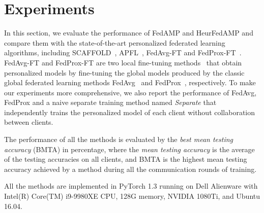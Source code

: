 
\section{Experiments}
\label{sec:exp}

In this section, we evaluate the performance of {FedAMP} and {HeurFedAMP} and compare them with the state-of-the-art personalized federated learning algorithms, including SCAFFOLD~\cite{karimireddy2019scaffold}, APFL~\cite{deng2020adaptive}, FedAvg-FT and FedProx-FT~\cite{wang2019federated}.
FedAvg-FT and FedProx-FT are two local fine-tuning methods~\cite{wang2019federated} that obtain personalized models by fine-tuning the global models produced by the classic global federated learning methods
FedAvg~\cite{mcmahan2016communication} and FedProx~\cite{li2018federated}, respectively.
To make our experiments more comprehensive, we also report the performance of FedAvg, FedProx and a naive separate training method named \emph{Separate} that independently trains the personalized model of each client without collaboration between clients. 

The performance of all the methods is evaluated by the \emph{best mean testing accuracy} (BMTA) in percentage, where the \emph{mean testing accuracy} is the average of the testing accuracies on all clients, and BMTA is the highest mean testing accuracy achieved by a method during all the communication rounds of training.

All the methods are implemented in PyTorch 1.3 running on Dell Alienware with Intel(R) Core(TM) i9-9980XE CPU, 128G memory, NVIDIA 1080Ti, and Ubuntu 16.04.




